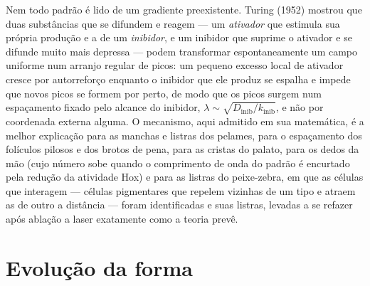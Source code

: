 \begin{proposition}\label{prop:b3:developmental-genetics:turing}
Nem todo padrão é lido de um gradiente preexistente. Turing (1952)
mostrou que duas substâncias que se difundem e reagem --- um
\emph{ativador} que estimula sua própria produção e a de um
\emph{inibidor}, e um inibidor que suprime o ativador e se difunde muito
mais depressa --- podem transformar espontaneamente um campo uniforme
num arranjo regular de picos: um pequeno excesso local de ativador cresce
por autorreforço enquanto o inibidor que ele produz se espalha e impede
que novos picos se formem por perto, de modo que os picos surgem num
espaçamento fixado pelo alcance do inibidor, $\lambda \sim \sqrt{D_{\text{inib}}/k_{\text{inib}}}$, e não por coordenada externa
alguma. O mecanismo, aqui admitido em sua matemática, é a melhor
explicação para as manchas e listras dos pelames, para o espaçamento dos
folículos pilosos e dos brotos de pena, para as cristas do palato, para
os dedos da mão (cujo número sobe quando o comprimento de onda do padrão
é encurtado pela redução da atividade Hox) e para as listras do
peixe-zebra, em que as células que interagem --- células pigmentares que
repelem vizinhas de um tipo e atraem as de outro a distância --- foram
identificadas e suas listras, levadas a se refazer após ablação a laser
exatamente como a teoria prevê.
\end{proposition}
\admitted

\section{Evolução da forma}

